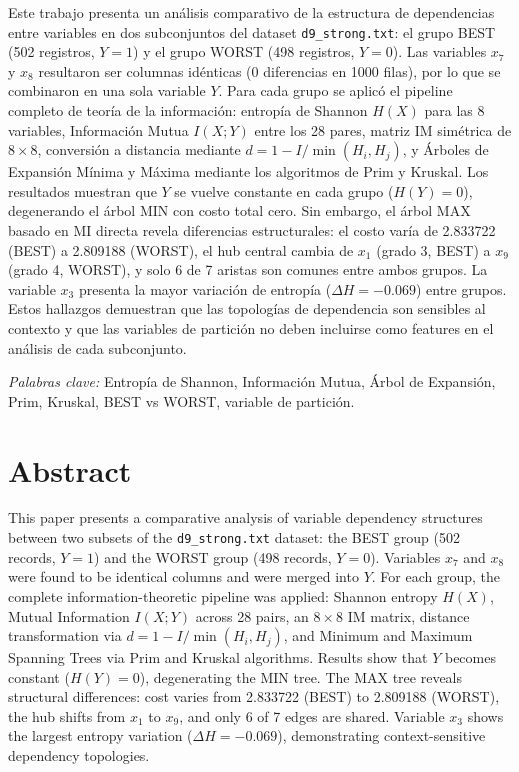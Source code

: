\documentclass[12pt, a4paper]{article}
\begin{document}
Este trabajo presenta un análisis comparativo de la estructura de
dependencias entre variables en dos subconjuntos del dataset
\texttt{d9\_strong.txt}: el grupo BEST (502 registros, $Y = 1$) y el grupo
WORST (498 registros, $Y = 0$). Las variables $x_7$ y $x_8$ resultaron
ser columnas idénticas (0 diferencias en 1000 filas), por lo que se
combinaron en una sola variable $Y$. Para cada grupo se aplicó el
pipeline completo de teoría de la información: entropía de Shannon
$H(X)$ para las 8 variables, Información Mutua $I(X;Y)$ entre los 28
pares, matriz IM simétrica de $8 \times 8$, conversión a distancia
mediante $d = 1 - I/\min(H_i, H_j)$, y Árboles de Expansión Mínima y
Máxima mediante los algoritmos de Prim y Kruskal. Los resultados muestran
que $Y$ se vuelve constante en cada grupo ($H(Y) = 0$), degenerando el
árbol MIN con costo total cero. Sin embargo, el árbol MAX basado en MI
directa revela diferencias estructurales: el costo varía de 2.833722 (BEST)
a 2.809188 (WORST), el hub central cambia de $x_1$ (grado 3, BEST) a $x_9$
(grado 4, WORST), y solo 6 de 7 aristas son comunes entre ambos grupos. La
variable $x_3$ presenta la mayor variación de entropía ($\Delta H = -0.069$)
entre grupos. Estos hallazgos demuestran que las topologías de dependencia
son sensibles al contexto y que las variables de partición no deben incluirse
como features en el análisis de cada subconjunto.

\vspace{0.5cm}
\noindent\textit{Palabras clave:} Entropía de Shannon, Información Mutua,
Árbol de Expansión, Prim, Kruskal, BEST vs WORST, variable de partición.


\section*{Abstract}

This paper presents a comparative analysis of variable dependency structures
between two subsets of the \texttt{d9\_strong.txt} dataset: the BEST group
(502 records, $Y = 1$) and the WORST group (498 records, $Y = 0$). Variables
$x_7$ and $x_8$ were found to be identical columns and were merged into $Y$.
For each group, the complete information-theoretic pipeline was applied:
Shannon entropy $H(X)$, Mutual Information $I(X;Y)$ across 28 pairs, an
$8 \times 8$ IM matrix, distance transformation via $d = 1 - I/\min(H_i, H_j)$,
and Minimum and Maximum Spanning Trees via Prim and Kruskal algorithms. Results
show that $Y$ becomes constant ($H(Y) = 0$), degenerating the MIN tree. The MAX
tree reveals structural differences: cost varies from 2.833722 (BEST) to
2.809188 (WORST), the hub shifts from $x_1$ to $x_9$, and only 6 of 7 edges
are shared. Variable $x_3$ shows the largest entropy variation ($\Delta H =
-0.069$), demonstrating context-sensitive dependency topologies.
\end{document}
